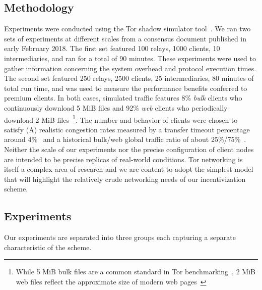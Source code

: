 \subsection{Methodology}
\label{subsec:methodology}


Experiments were conducted using the Tor shadow simulator
tool~\cite{jansen2011shadow, tracey2018high}. We ran two sets of experiments at
different scales from a consensus document published in early February 2018. The
first set featured 100 relays, 1000 clients, 10 intermediaries, and ran for a
total of 90 minutes. These experiments were used to gather information
concerning the system overhead and protocol execution times. The second set
featured 250 relays, 2500 clients, 25 intermediaries, 80 minutes of total run
time, and was used to measure the performance benefits conferred to premium
clients. In both cases, simulated traffic features 8\% \emph{bulk} clients who
continuously download 5 MiB files and 92\% \emph{web} clients who periodically
download 2 MiB files~\footnote{While 5 MiB bulk files are a common standard in
  Tor benchmarking~\cite{portal2018tormetrics}, 2 MiB web files reflect the
  approximate size of modern web pages~\cite{team2018httparchive}}. The number
and behavior of clients were chosen to satisfy (A) realistic congestion rates
measured by a transfer timeout percentage around 4\%~\cite{portal2018tormetrics}
and a historical bulk/web global traffic ratio of about
25\%/75\%~\cite{privcount-ccs2016, learning-ccs2018}. Neither the scale of our experiments nor the precise configuration of
client nodes are intended to be precise replicas of real-world conditions. Tor
networking is itself a complex area of research and we are content to adopt the
simplest model that will highlight the relatively crude networking needs of our
incentivization scheme.

\subsection{Experiments}
\label{subsec:experiments}
Our experiments are separated into three groups each capturing a separate
characteristic of the scheme.


